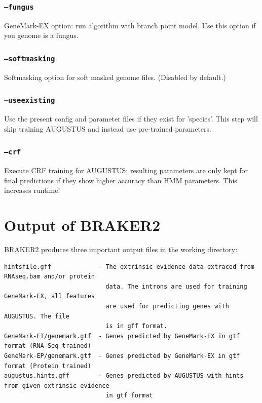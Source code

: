 \documentclass[a4paper,10pt]{report}
\begin{document}
\subsection{\texttt{--fungus}}                             GeneMark-EX option: run algorithm with branch point model. Use this option if you genome is a fungus.
    \subsection{\texttt{--softmasking}}                        Softmasking option for soft masked genome files. (Disabled by default.)
   
    \subsection{\texttt{--useexisting}}                        Use the present config and parameter files if they exist for 
                                         'species'. This step will skip training AUGUSTUS and instead use pre-trained parameters.
  
    \subsection{\texttt{--crf}}                                Execute CRF training for AUGUSTUS; resulting parameters are only kept for
                                         final predictions if they show higher accuracy than HMM parameters. This increases runtime!
              


\chapter{Output of BRAKER2}

BRAKER2 produces three important output files in the working directory:

\begin{verbatim}
hintsfile.gff             - The extrinsic evidence data extraced from RNAseq.bam and/or protein
                            data. The introns are used for training GeneMark-EX, all features
                            are used for predicting genes with AUGUSTUS. The file
                            is in gff format.
GeneMark-ET/genemark.gtf  - Genes predicted by GeneMark-EX in gtf format (RNA-Seq trained)
GeneMark-EP/genemark.gtf  - Genes predicted by GeneMark-EX in gtf format (Protein trained)
augustus.hints.gff        - Genes predicted by AUGUSTUS with hints from given extrinsic evidence
                            in gtf format

\end{verbatim}
\end{document}
